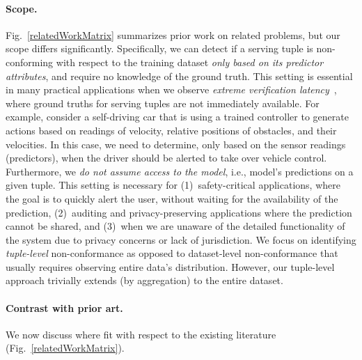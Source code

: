 \paragraph{Scope.}  Fig.~\ref{relatedWorkMatrix} summarizes prior
work on related problems, but our scope differs significantly. Specifically, we
can detect if a serving tuple is non-conforming with respect to the training
dataset \emph{only based on its predictor attributes}, and require no knowledge
of the ground truth. This setting is essential in many practical applications
when we observe \emph{extreme verification latency}~\cite{souzaSDM:2015}, where
ground truths for serving tuples are not immediately available. For example,
consider a self-driving car that is using a trained controller to generate
actions based on readings of velocity, relative positions of obstacles, and
their velocities. In this case, we need to determine, only based on the sensor
readings (predictors), when the driver should be alerted to take over vehicle
control.
%
Furthermore, we \emph{do not assume access to the model}, i.e., model's
predictions on a given tuple. This setting is necessary for (1)~safety-critical
applications, where the goal is to quickly alert the user, without waiting for
the availability of the prediction, (2)~auditing and privacy-preserving
applications where the prediction cannot be shared, and (3)~when we are unaware
of the detailed functionality of the system due to privacy concerns or lack of
jurisdiction.
%
We focus on identifying \emph{tuple-level} non-conformance as opposed to
dataset-level non-conformance that usually requires observing entire data's
distribution. However, our tuple-level approach trivially extends (by
aggregation) to the entire dataset.



\smallskip

\paragraph{Contrast with prior art.} We now discuss where \dis fit with respect
to the existing literature (Fig.~\ref{relatedWorkMatrix}).

